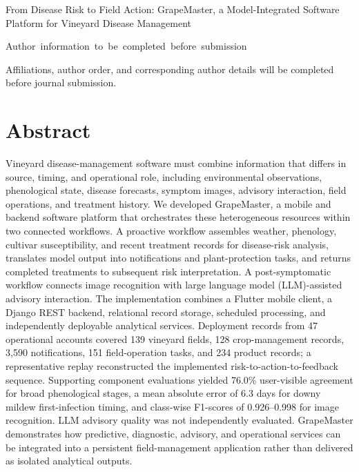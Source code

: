 \documentclass[12pt]{article}
\newcommand{\manuscripttitle}{From Disease Risk to Field Action: GrapeMaster, a Model-Integrated Software Platform for Vineyard Disease Management}
\begin{document}
\linenumbers

\begin{center}
{\LARGE{}\selectfont \manuscripttitle\par}
\end{center}

\vspace{0.8em}

\begingroup
\normalsize
{}
\noindent
\mbox{Author~information~to~be~completed~before~submission}
\par
\vspace{0.7em}

\noindent
Affiliations, author order, and corresponding author details will be completed before journal submission.
\par
\endgroup

\vspace{1em}

\section*{Abstract}

Vineyard disease-management software must combine information that differs in source, timing, and operational role, including environmental observations, phenological state, disease forecasts, symptom images, advisory interaction, field operations, and treatment history. We developed GrapeMaster, a mobile and backend software platform that orchestrates these heterogeneous resources within two connected workflows. A proactive workflow assembles weather, phenology, cultivar susceptibility, and recent treatment records for disease-risk analysis, translates model output into notifications and plant-protection tasks, and returns completed treatments to subsequent risk interpretation. A post-symptomatic workflow connects image recognition with large language model (LLM)-assisted advisory interaction. The implementation combines a Flutter mobile client, a Django REST backend, relational record storage, scheduled processing, and independently deployable analytical services. Deployment records from 47 operational accounts covered 139 vineyard fields, 128 crop-management records, 3,590 notifications, 151 field-operation tasks, and 234 product records; a representative replay reconstructed the implemented risk-to-action-to-feedback sequence. Supporting component evaluations yielded 76.0\% user-visible agreement for broad phenological stages, a mean absolute error of 6.3 days for downy mildew first-infection timing, and class-wise F1-scores of 0.926--0.998 for image recognition. LLM advisory quality was not independently evaluated. GrapeMaster demonstrates how predictive, diagnostic, advisory, and operational services can be integrated into a persistent field-management application rather than delivered as isolated analytical outputs.
\end{document}
